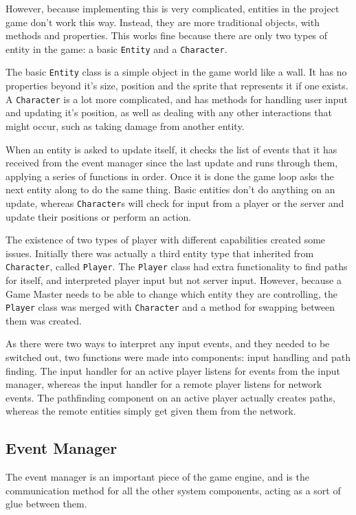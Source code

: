 However, because implementing this is very complicated, entities in the project game don't work this way. Instead, they are more traditional objects, with methods and properties. This works fine because there are only two types of entity in the game: a basic \texttt{Entity} and a \texttt{Character}.

The basic \texttt{Entity} class is a simple object in the game world like a wall. It has no properties beyond it's size, position and the sprite that represents it if one exists. A \texttt{Character} is a lot more complicated, and has methods for handling user input and updating it's position, as well as dealing with any other interactions that might occur, such as taking damage from another entity.

When an entity is asked to update itself, it checks the list of events that it has received from the event manager since the last update and runs through them, applying a series of functions in order. Once it is done the game loop asks the next entity along to do the same thing. Basic entities don't do anything on an update, whereas \texttt{Character}s will check for input from a player or the server and update their positions or perform an action.

The existence of two types of player with different capabilities created some issues. Initially there was actually a third entity type that inherited from \texttt{Character}, called \texttt{Player}. The \texttt{Player} class had extra functionality to find paths for itself, and interpreted player input but not server input. However, because a Game Master needs to be able to change which entity they are controlling, the \texttt{Player} class was merged with \texttt{Character} and a method for swapping between them was created.

As there were two ways to interpret any input events, and they needed to be switched out, two functions were made into components: input handling and path finding. The input handler for an active player listens for events from the input manager, whereas the input handler for a remote player listens for network events. The pathfinding component on an active player actually creates paths, whereas the remote entities simply get given them from the network.

\subsection{Event Manager}\label{subsection:eventmanager}
The event manager is an important piece of the game engine, and is the communication method for all the other system components, acting as a sort of glue between them.

